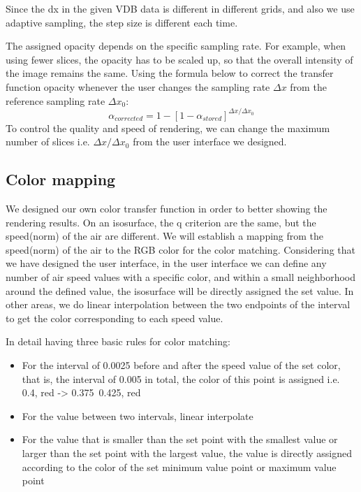 \documentclass[acmtog]{acmart}
\begin{document}
Since the dx in the given VDB data is different in different grids, and also we use adaptive sampling, the step size is different each time. 


The assigned opacity depends on the specific sampling rate. For example, when using fewer slices, the opacity has to be scaled up, so that the overall intensity of the image remains the same. Using the formula below to correct the transfer function opacity whenever the user changes the sampling rate $\Delta x$ from the reference sampling rate $\Delta x_0$:
\[\alpha_{corrected} = 1 - [1 - \alpha_{stored}]^{\Delta x / \Delta x_0}\]
To control the quality and speed of rendering, we can change the maximum number of slices i.e. $\Delta x / \Delta x_0$ from the user interface we designed.


\subsection{Color mapping}


We designed our own color transfer function in order to better showing the rendering results. On an isosurface, the q criterion are the same, but the speed(norm) of the air are different. We will establish a mapping from the speed(norm) of the air to the RGB color for the color matching. Considering that we have designed the user interface, in the user interface we can define any number of air speed values with a specific color, and within a small neighborhood around the defined value, the isosurface will be directly assigned the set value. In other areas, we do linear interpolation between the two endpoints of the interval to get the color corresponding to each speed value.


In detail having three basic rules for color matching:
\begin{itemize}
	\item For the interval of 0.0025 before and after the speed value of the set color, that is, the interval of 0.005 in total, the color of this point is assigned i.e. 0.4, red -> 0.375~0.425, red\\
	\item For the value between two intervals, linear interpolate\\
	\item For the value that is smaller than the set point with the smallest value or larger than the set point with the largest value, the value is directly assigned according to the color of the set minimum value point or maximum value point
\end{itemize}
\end{document}
